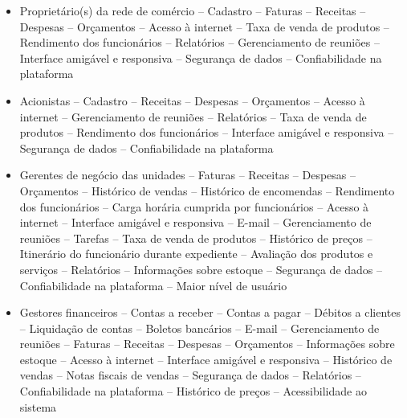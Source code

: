 \begin{itemize}
	\item Proprietário(s) da rede de comércio
		\subitem -- Cadastro
		\subitem -- Faturas
		\subitem -- Receitas
		\subitem -- Despesas
		\subitem -- Orçamentos
		\subitem -- Acesso à internet
		\subitem -- Taxa de venda de produtos
		\subitem -- Rendimento dos funcionários
		\subitem -- Relatórios
		\subitem -- Gerenciamento de reuniões
		\subitem -- Interface amigável e responsiva 
		\subitem -- Segurança de dados
		\subitem -- Confiabilidade na plataforma
	\item Acionistas
		\subitem -- Cadastro
		\subitem -- Receitas
		\subitem -- Despesas
		\subitem -- Orçamentos
		\subitem -- Acesso à internet
		\subitem -- Gerenciamento de reuniões
		\subitem -- Relatórios
		\subitem -- Taxa de venda de produtos
		\subitem -- Rendimento dos funcionários
		\subitem -- Interface amigável e responsiva 
		\subitem -- Segurança de dados
		\subitem -- Confiabilidade na plataforma
	\item Gerentes de negócio das unidades
		\subitem -- Faturas
		\subitem -- Receitas
		\subitem -- Despesas
		\subitem -- Orçamentos
		\subitem -- Histórico de vendas
		\subitem -- Histórico de encomendas
		\subitem -- Rendimento dos funcionários
		\subitem -- Carga horária cumprida por funcionários
		\subitem -- Acesso à internet
		\subitem -- Interface amigável e responsiva 
		\subitem -- E-mail
		\subitem -- Gerenciamento de reuniões
		\subitem -- Tarefas
		\subitem -- Taxa de venda de produtos
		\subitem -- Histórico de preços
		\subitem -- Itinerário do funcionário durante expediente 
		\subitem -- Avaliação dos produtos e serviços 
		\subitem -- Relatórios
		\subitem -- Informações sobre estoque
		\subitem -- Segurança de dados
		\subitem -- Confiabilidade na plataforma
		\subitem -- Maior nível de usuário
	\item Gestores financeiros
		\subitem -- Contas a receber
		\subitem -- Contas a pagar
		\subitem -- Débitos a clientes
		\subitem -- Liquidação de contas
		\subitem -- Boletos bancários
		\subitem -- E-mail
		\subitem -- Gerenciamento de reuniões
		\subitem -- Faturas
		\subitem -- Receitas
		\subitem -- Despesas
		\subitem -- Orçamentos
		\subitem -- Informações sobre estoque
		\subitem -- Acesso à internet
		\subitem -- Interface amigável e responsiva 
		\subitem -- Histórico de vendas
		\subitem -- Notas fiscais de vendas
		\subitem -- Segurança de dados
		\subitem -- Relatórios
		\subitem -- Confiabilidade na plataforma
		\subitem -- Histórico de preços
		\subitem -- Acessibilidade ao sistema

\end{itemize}
